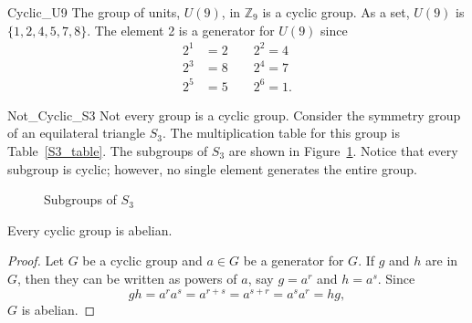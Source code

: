  
\begin{example}{Cyclic_U9}
The group of units, $U(9)$, in ${\mathbb Z}_9$ is a cyclic group.  As a
set, $U(9)$ is $\{ 1, 2, 4, 5, 7, 8  \}$. The element 2 is a generator
for $U(9)$ since 
\begin{align*}
2^1 & = 2 \qquad 2^2 = 4 \\
2^3 & = 8 \qquad 2^4 = 7 \\
2^5 & =  5 \qquad 2^6 = 1.
\end{align*}
\end{example}
 
 
\begin{example}{Not_Cyclic_S3}
Not every group is a cyclic group.  Consider the symmetry group of an
equilateral triangle $S_3$.  The multiplication table for this group
is Table~\ref{S3_table}. The subgroups of $S_3$ are shown in
Figure~\ref{subgrpsS3}.  Notice that every subgroup is cyclic;
however, no single element generates the entire group.
\hspace*{1in}
\end{example}


\begin{figure}[htb] %
\begin{center}
\end{center}
\caption{Subgroups of $S_3$}
\label{subgrpsS3}
\end{figure}
 
 
\begin{theorem}
Every cyclic group is abelian.
\end{theorem}
 
 
\begin{proof}
Let $G$ be a cyclic group and $a \in G$ be a generator for $G$. If
$g$ and $h$ are in $G$, then they can be written as powers of $a$,
say $g = a^r$ and $h = a^s$. Since
\[
g  h = a^r a^s = a^{r+s} = a^{s+r} = a^s a^r = h g,
\]
$G$ is abelian.
\end{proof}
 
